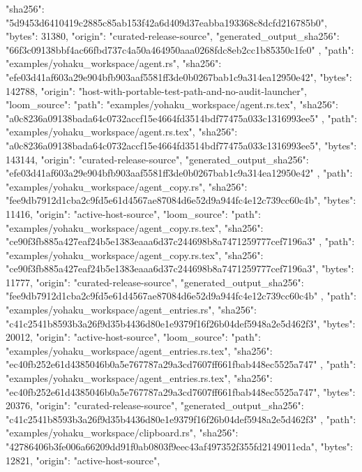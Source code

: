 {{      "sha256": "5d9453d6410419c2885c85ab153f42a6d409d37eabba193368c8dcfd216785b0",
      "bytes": 31380,
      "origin": "curated-release-source",
      "generated_output_sha256": "66f3c09138bbf4ac66fbd737c4a50a464950aaa0268fdc8eb2cc1b85350c1fe0"
    },
    {
      "path": "examples/yohaku_workspace/agent.rs",
      "sha256": "efe03d41af603a29e904bfb903aaf5581ff3de0b0267bab1c9a314ea12950e42",
      "bytes": 142788,
      "origin": "host-with-portable-test-path-and-no-audit-launcher",
      "loom_source": {
        "path": "examples/yohaku_workspace/agent.rs.tex",
        "sha256": "a0c8236a09138bada64c0732accf15e4664fd3514bdf77475a033c1316993ee5"
      }
    },
    {
      "path": "examples/yohaku_workspace/agent.rs.tex",
      "sha256": "a0c8236a09138bada64c0732accf15e4664fd3514bdf77475a033c1316993ee5",
      "bytes": 143144,
      "origin": "curated-release-source",
      "generated_output_sha256": "efe03d41af603a29e904bfb903aaf5581ff3de0b0267bab1c9a314ea12950e42"
    },
    {
      "path": "examples/yohaku_workspace/agent_copy.rs",
      "sha256": "fee9db7912d1cba2c9fd5e61d4567ae87084d6e52d9a944fc4e12c739cc60c4b",
      "bytes": 11416,
      "origin": "active-host-source",
      "loom_source": {
        "path": "examples/yohaku_workspace/agent_copy.rs.tex",
        "sha256": "ce90f3fb885a427eaf24b5e1383eaaa6d37c244698b8a7471259777cef7196a3"
      }
    },
    {
      "path": "examples/yohaku_workspace/agent_copy.rs.tex",
      "sha256": "ce90f3fb885a427eaf24b5e1383eaaa6d37c244698b8a7471259777cef7196a3",
      "bytes": 11777,
      "origin": "curated-release-source",
      "generated_output_sha256": "fee9db7912d1cba2c9fd5e61d4567ae87084d6e52d9a944fc4e12c739cc60c4b"
    },
    {
      "path": "examples/yohaku_workspace/agent_entries.rs",
      "sha256": "c41c2541b8593b3a26f9d35b4436d80e1e9379f16f26b04def5948a2e5d462f3",
      "bytes": 20012,
      "origin": "active-host-source",
      "loom_source": {
        "path": "examples/yohaku_workspace/agent_entries.rs.tex",
        "sha256": "ec40fb252e61d4385046b0a5e767787a29a3cd7607ff661fbab448ec5525a747"
      }
    },
    {
      "path": "examples/yohaku_workspace/agent_entries.rs.tex",
      "sha256": "ec40fb252e61d4385046b0a5e767787a29a3cd7607ff661fbab448ec5525a747",
      "bytes": 20376,
      "origin": "curated-release-source",
      "generated_output_sha256": "c41c2541b8593b3a26f9d35b4436d80e1e9379f16f26b04def5948a2e5d462f3"
    },
    {
      "path": "examples/yohaku_workspace/clipboard.rs",
      "sha256": "42786406b3fe006a66209dd91f0ab0803f9eec43af497352f355fd2149011eda",
      "bytes": 12821,
      "origin": "active-host-source",
}}
